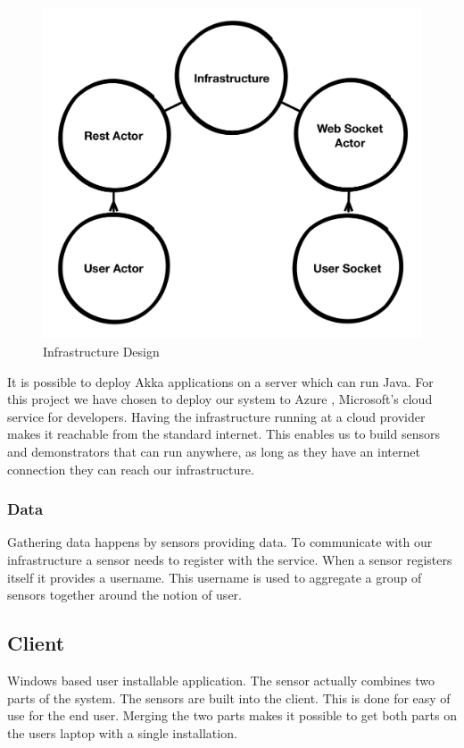 \documentclass{sigchi}
\begin{document}
\begin{figure}[H]
  \centering
  \includegraphics[width=\columnwidth]{figures/infrastructure_design.pdf}
  \caption{Infrastructure Design}
  \label{fig:infrastructure}
\end{figure}

It is possible to deploy Akka applications on a server which can run Java.
For this project we have chosen to deploy our system to Azure \cite{azure}, Microsoft's cloud service for developers.
Having the infrastructure running at a cloud provider makes it reachable from the standard internet.
This enables us to build sensors and demonstrators that can run anywhere, as long as they have an internet connection they can reach our infrastructure.

\subsubsection{Data}
Gathering data happens by sensors providing data.
To communicate with our infrastructure a sensor needs to register with the service.
When a sensor registers itself it provides a username.
This username is used to aggregate a group of sensors together around the notion of user.

\subsection{Client}
Windows based user installable application.
The sensor actually combines two parts of the system.
The sensors are built into the client.
This is done for easy of use for the end user.
Merging the two parts makes it possible to get both parts on the users laptop with a single installation.
\end{document}
